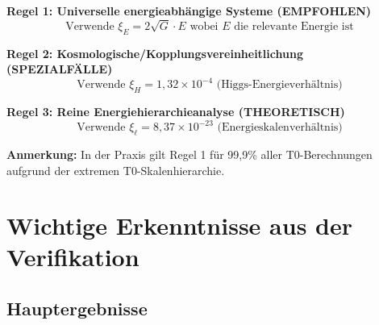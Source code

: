 \documentclass[12pt,a4paper]{article}
\begin{document}
	\begin{tcolorbox}[colback=blue!5!white,colframe=blue!75!black,title=Anwendungsregeln für $\xi$-Parameter (Reine Energie)]
		\textbf{Regel 1: Universelle energieabhängige Systeme (EMPFOHLEN)}
		\begin{equation}
			\text{Verwende } \xi_E = 2\sqrt{G} \cdot E \text{ wobei } E \text{ die relevante Energie ist}
		\end{equation}
		
		\textbf{Regel 2: Kosmologische/Kopplungsvereinheitlichung (SPEZIALFÄLLE)}
		\begin{equation}
			\text{Verwende } \xi_H = 1,32 \times 10^{-4} \text{ (Higgs-Energieverhältnis)}
		\end{equation}
		
		\textbf{Regel 3: Reine Energiehierarchieanalyse (THEORETISCH)}
		\begin{equation}
			\text{Verwende } \xi_\ell = 8,37 \times 10^{-23} \text{ (Energieskalenverhältnis)}
		\end{equation}
		
		\textbf{Anmerkung:} In der Praxis gilt Regel 1 für 99,9\% aller T0-Berechnungen aufgrund der extremen T0-Skalenhierarchie.
	\end{tcolorbox}
	
	\section{Wichtige Erkenntnisse aus der Verifikation}
	
	\subsection{Hauptergebnisse}
	
\end{document}
